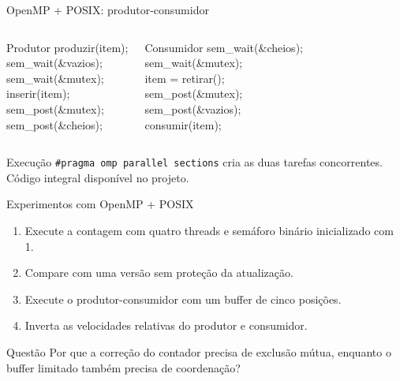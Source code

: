 \documentclass[aspectratio=169,11pt]{beamer}
\begin{document}
\begin{frame}[fragile]{OpenMP + POSIX: produtor-consumidor}
\small
\begin{columns}[T,onlytextwidth]
\begin{block}{Produtor}
\ttfamily\scriptsize
produzir(item);\\
sem\_wait(\&vazios);\\
sem\_wait(\&mutex);\\
inserir(item);\\
sem\_post(\&mutex);\\
sem\_post(\&cheios);
\end{block}
\begin{block}{Consumidor}
\ttfamily\scriptsize
sem\_wait(\&cheios);\\
sem\_wait(\&mutex);\\
item = retirar();\\
sem\_post(\&mutex);\\
sem\_post(\&vazios);\\
consumir(item);
\end{block}
\end{columns}
\vspace{0.18cm}
\begin{block}{Execução}
\texttt{\#pragma omp parallel sections} cria as duas tarefas concorrentes. Código integral disponível no projeto.
\end{block}
\end{frame}

\begin{frame}{Experimentos com OpenMP + POSIX}
\begin{enumerate}
\setlength\itemsep{0.25cm}
\item Execute a contagem com quatro threads e semáforo binário inicializado com 1.
\item Compare com uma versão sem proteção da atualização.
\item Execute o produtor-consumidor com um buffer de cinco posições.
\item Inverta as velocidades relativas do produtor e consumidor.
\end{enumerate}
\vspace{0.2cm}
\begin{alertblock}{Questão}
Por que a correção do contador precisa de exclusão mútua, enquanto o buffer limitado também precisa de coordenação?
\end{alertblock}
\end{frame}
\end{document}
